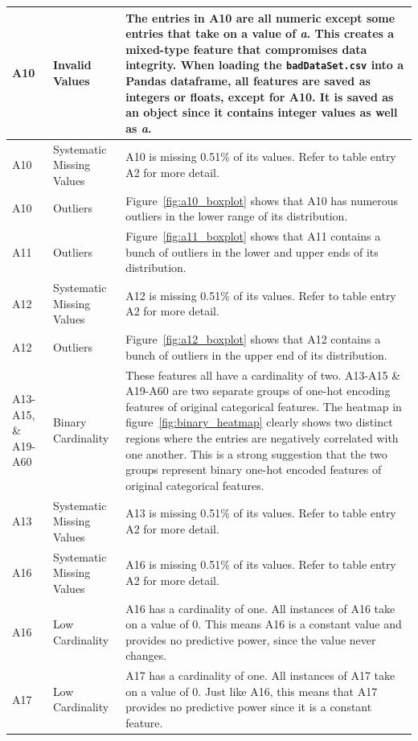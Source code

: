 \documentclass[11pt]{report}
\begin{document}
\begin{longtable}{lp{4cm}p{7cm}}
\midrule
A10 & Invalid Values & The entries in A10 are all numeric except some entries that take on a value of \textit{a}. This creates a mixed-type feature that compromises data integrity. When loading the \texttt{badDataSet.csv} into a Pandas dataframe, all features are saved as integers or floats, except for A10. It is saved as an object since it contains integer values as well as \textit{a}. \\
\midrule
A10 & Systematic Missing Values & A10 is missing 0.51\% of its values.  Refer to table entry A2 for more detail. \\
\midrule
A10 & Outliers & Figure~\ref{fig:a10_boxplot} shows that A10 has numerous outliers in the lower range of its distribution. \\
\midrule
A11 & Outliers & Figure~\ref{fig:a11_boxplot} shows that A11 contains a bunch of outliers in the lower and upper ends of its distribution. \\
\midrule
A12 & Systematic Missing Values & A12 is missing 0.51\% of its values.  Refer to table entry A2 for more detail. \\
\midrule
A12 & Outliers & Figure~\ref{fig:a12_boxplot} shows that A12 contains a bunch of outliers in the upper end of its distribution. \\
\midrule
A13-A15, \& A19-A60 & Binary Cardinality & These features all have a cardinality of two. A13-A15 \& A19-A60 are two separate groups of one-hot encoding features of original categorical features. The heatmap in figure~\ref{fig:binary_heatmap} clearly shows two distinct regions where the entries are negatively correlated with one another. This is a strong suggestion that the two groups represent binary one-hot encoded features of original categorical features. \\
\midrule
A13 & Systematic Missing Values & A13 is missing 0.51\% of its values.  Refer to table entry A2 for more detail. \\
\midrule
A16 & Systematic Missing Values & A16 is missing 0.51\% of its values.  Refer to table entry A2 for more detail. \\
\midrule
A16 & Low Cardinality & A16 has a cardinality of one. All instances of A16 take on a value of 0. This means A16 is a constant value and provides no predictive power, since the value never changes. \\
\midrule
A17 & Low Cardinality & A17 has a cardinality of one. All instances of A17 take on a value of 0. Just like A16, this means that A17 provides no predictive power since it is a constant feature. \\ 

\end{longtable}
\end{document}
